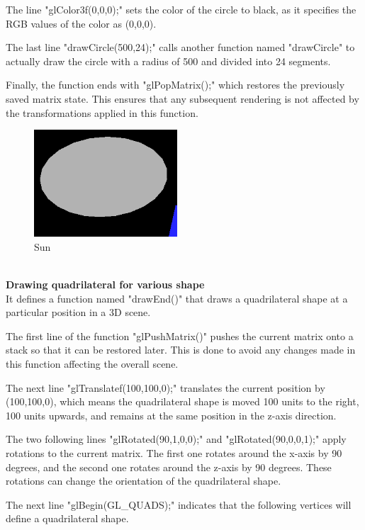 \documentclass[12pt,a4]{article}
\begin{document}
{The line "glColor3f(0,0,0);" sets the color of the circle to black, as it specifies the RGB values of the color as (0,0,0).

The last line "drawCircle(500,24);" calls another function named "drawCircle" to actually draw the circle with a radius of 500 and divided into 24 segments.

Finally, the function ends with "glPopMatrix();" which restores the previously saved matrix state. This ensures that any subsequent rendering is not affected by the transformations applied in this function.
\begin{figure}[h]
    \centering
    \includegraphics[width=.5\textwidth, height=4cm]{Screenshot (54).png}
    \caption{Sun}
\end{figure}\\

\textbf{\Large{Drawing quadrilateral for various shape}}\\


 It defines a function named "drawEnd()" that draws a quadrilateral shape at a particular position in a 3D scene.

The first line of the function "glPushMatrix()" pushes the current matrix onto a stack so that it can be restored later. This is done to avoid any changes made in this function affecting the overall scene.

The next line "glTranslatef(100,100,0);" translates the current position by (100,100,0), which means the quadrilateral shape is moved 100 units to the right, 100 units upwards, and remains at the same position in the z-axis direction.

The two following lines "glRotated(90,1,0,0);" and "glRotated(90,0,0,1);" apply rotations to the current matrix. The first one rotates around the x-axis by 90 degrees, and the second one rotates around the z-axis by 90 degrees. These rotations can change the orientation of the quadrilateral shape.

The next line "glBegin(GL\_QUADS);" indicates that the following vertices will define a quadrilateral shape.

}
\end{document}
